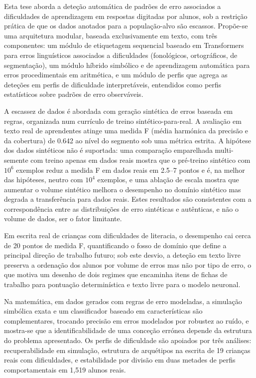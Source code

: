 \begin{abstractotherlanguage}

Esta tese aborda a deteção automática de padrões de erro associados a dificuldades de aprendizagem em respostas digitadas por alunos, sob a restrição prática de que os dados anotados para a população-alvo são escassos. Propõe-se uma arquitetura modular, baseada exclusivamente em texto, com três componentes: um módulo de etiquetagem sequencial baseado em Transformers para erros linguísticos associados a dificuldades (fonológicos, ortográficos, de segmentação), um módulo híbrido simbólico e de aprendizagem automática para erros procedimentais em aritmética, e um módulo de perfis que agrega as deteções em perfis de dificuldade interpretáveis, entendidos como perfis estatísticos sobre padrões de erro observáveis.

A escassez de dados é abordada com geração sintética de erros baseada em regras, organizada num currículo de treino sintético-para-real. A avaliação em texto real de aprendentes atinge uma medida F (média harmónica da precisão e da cobertura) de 0.642 ao nível do segmento sob uma métrica estrita. A hipótese dos dados sintéticos não é suportada: uma comparação emparelhada multi-semente com treino apenas em dados reais mostra que o pré-treino sintético com $10^6$ exemplos reduz a medida F em dados reais em 2.5--7 pontos e é, na melhor das hipóteses, neutro com $10^4$ exemplos, e uma ablação de escala mostra que aumentar o volume sintético melhora o desempenho no domínio sintético mas degrada a transferência para dados reais. Estes resultados são consistentes com a correspondência entre as distribuições de erro sintéticas e autênticas, e não o volume de dados, ser o fator limitante.

Em escrita real de crianças com dificuldades de literacia, o desempenho cai cerca de 20 pontos de medida F, quantificando o fosso de domínio que define a principal direção de trabalho futuro; sob este desvio, a deteção em texto livre preserva a ordenação dos alunos por volume de erros mas não por tipo de erro, o que motiva um desenho de dois regimes que encaminha itens de fichas de trabalho para pontuação determinística e texto livre para o modelo neuronal.

Na matemática, em dados gerados com regras de erro modeladas, a simulação simbólica exata e um classificador baseado em características são complementares, trocando precisão em erros modelados por robustez ao ruído, e mostra-se que a identificabilidade de uma conceção errónea depende da estrutura do problema apresentado. Os perfis de dificuldade são apoiados por três análises: recuperabilidade em simulação, estrutura de arquétipos na escrita de 19 crianças reais com dificuldades, e estabilidade por divisão em duas metades de perfis comportamentais em 1{,}519 alunos reais.


\end{abstractotherlanguage}
